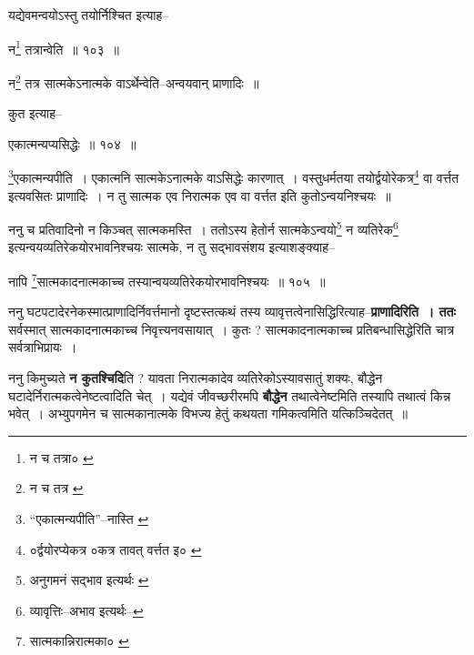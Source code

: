\documentclass[article,12pt,a4paper]{memoir}
\begin{document}
	  \pstart यद्येवमन्वयोऽस्तु तयोर्निश्चित इत्याह--
	\pend
       
	  \bigskip
	  \begingroup
	

	  \pstart न\footnote{न च तत्रा० \cite{dp-msC} \cite{dp-msD}} तत्रान्वेति ॥ १०३ ॥
	\pend
      
	  \endgroup
	 

	  \pstart न\footnote{न च तत्र \cite{dp-msD}} तत्र सात्मकेऽनात्मके वाऽर्थेन्वेति--अन्वयवान् प्राणादिः ॥
	\pend
       

	  \pstart कुत इत्याह--
	\pend
       
	  \bigskip
	  \begingroup
	

	  \pstart एकात्मन्यप्यसिद्धेः ॥ १०४ ॥
	\pend
      
	  \endgroup
	 

	  \pstart \footnote{“एकात्मन्यपीति”--नास्ति \cite{dp-msA} \cite{dp-msB} \cite{dp-msC} \cite{dp-msD} \cite{dp-edP} \cite{dp-edH} \cite{dp-edN}}एकात्मन्यपीति । एकात्मनि सात्मकेऽनात्मके वाऽसिद्धेः कारणात् । वस्तुधर्मतया तयोर्द्वयोरेकत्र\footnote{०र्द्वयोरप्येकत्र \cite{dp-msC} \cite{dp-msD} ०कत्र तावत् वर्त्तत इ० \cite{dp-msC}} वा वर्त्तत इत्यवसितः प्राणादिः । न तु सात्मक एव निरात्मक एव वा वर्त्तत इति कुतोऽन्वयनिश्चयः ॥
	\pend
       

	  \pstart ननु च प्रतिवादिनो न किञ्चत् सात्मकमस्ति । ततोऽस्य हेतोर्न सात्मकेऽन्वयो\footnote{अनुगमनं सद्भाव इत्यर्थः \cite{dp-msD-n}} न व्यतिरेक\footnote{व्यावृत्तिः--अभाव इत्यर्थः--\cite{dp-msD-n}} इत्यन्वयव्यतिरेकयोरभावनिश्चयः सात्मके, न तु सद्भावसंशय इत्याशङ्क्याह--
	\pend
       
	  \bigskip
	  \begingroup
	

	  \pstart नापि \footnote{सात्मकान्निरात्मका० \cite{dp-msB} \cite{dp-msD} \cite{dp-edP} \cite{dp-edH} \cite{dp-edE} \cite{dp-edN}}सात्मकादनात्मकाच्च तस्यान्वयव्यतिरेकयोरभावनिश्चयः ॥ १०५ ॥
	\pend
      
	  \endgroup
	
	  \endgroup
	

	  \pstart ननु घटपटादेरनेकस्मात्प्राणादिर्निवर्त्तमानो दृष्टस्तत्कथं तस्य व्यावृत्तत्वेनासिद्धिरित्याह--\textbf{प्राणादिरिति । ततः} सर्वस्मात् सात्मकादनात्मकाच्च निवृत्त्यनवसायात् । कुतः ? सात्मकादनात्मकाच्च प्रतिबन्धासिद्धेरिति चात्र सर्वत्राभिप्रायः ।
	\pend
      

	  \pstart ननु किमुच्यते \textbf{न कुतश्चिदि}ति ? यावता निरात्मकादेव व्यतिरेकोऽस्यावसातुं शक्यः, बौद्धेन घटादेर्निरात्मकत्वेनेष्टत्वादिति चेत् । यद्येवं जीवच्छरीरमपि \textbf{बौद्धेन} तथात्वेनेष्टमिति तस्यापि तथात्वं किन्न भवेत् । अभ्युपगमेन च सात्मकानात्मके विभज्य हेतुं कथयता गमिकत्वमिति यत्किञ्चिदेतत् ॥
	\pend
      
\end{document}
